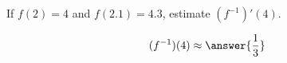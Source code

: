 \documentclass{ximera}
\author{Steven Gubkin}
\begin{document}
\begin{exercise}

If $f(2) = 4$ and $f(2.1) = 4.3$, estimate $(f^{-1})'(4)$.
\begin{prompt}
\[
(f^{-1})(4) \approx \answer{\frac{1}{3}}
\]
\end{prompt}
\end{exercise}
\end{document}
